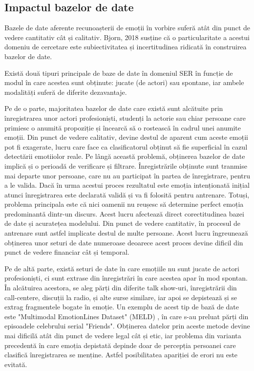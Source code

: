 \documentclass[a4paper,12pt]{book}
\begin{document}
				\subsection{Impactul bazelor de date}
					Bazele de date aferente recunoașterii de emoții în vorbire suferă atât din punct de vedere cantitativ cât și calitativ. Bjorn, 2018 \cite{bjorn1} susține că o particularitate a acestui domeniu de cercetare este subiectivitatea și incertitudinea ridicată în construirea bazelor de date. \par 
					Există două tipuri principale de baze de date în domeniul SER în funcție de modul în care acestea sunt obținute: jucate (de actori) sau spontane, iar ambele modalități suferă de diferite dezavantaje. \par
					Pe de o parte, majoritatea bazelor de date care există sunt alcătuite prin înregistrarea unor actori profesioniști, studenți la actorie sau chiar persoane care primiesc o anumită propoziție și încearcă să o rostească în cadrul unei anumite emoții. Din punct de vedere calitativ, devine destul de aparent cum aceste emoții pot fi exagerate, lucru care face ca clasificatorul obținut să fie superficial în cazul detectării emotiiolor reale. Pe lângă această problemă, obținerea bazelor de date implică și o perioadă de verificare și filtrare. Înregistrările obținute sunt tranmise mai departe unor persoane, care nu au participat în partea de înregistrare, pentru a le valida. Dacă în urma acestui proces rezultatul este emoția intenționată inițial atunci înregistrarea este declarată validă și va fi folosită pentru antrenare. Totuși, problema principala este că nici oamenii nu reușesc să determine perfect emoția predominantă dintr-un discurs. Acest lucru afectează direct corectitudinea bazei de date și acuratețea modelului. Din punct de vedere cantitativ, în procesul de antrenare sunt astfel implicate destul de multe persoane. Acest lucru îngreunează obținerea unor seturi de date numeroase deoarece acest proces devine dificil din punct de vedere financiar cât și temporal.\par
					Pe de altă parte, există seturi de date în care emoțiile nu sunt jucate de actori profesioniști, ci sunt extrase din înregistrări în care acestea apar în mod spontan. În alcătuirea acestora, se aleg părți din diferite talk show-uri, înregistrării din call-centere, discuții la radio, și alte surse similare, iar apoi se depistează și se extrag fragmentele bogate în emoție. Un exemplu de acest tip de bază de date este "Multimodal EmotionLines Dataset" (MELD) \cite{meld}, în care s-au preluat părți din episoadele celebrului serial "Friends". Obținerea datelor prin aceste metode devine mai dificilă atât din punct de vedere legal cât și etic, iar problema din varianta precedentă în care emoția depistată depinde doar de percepția persoanei care clasifică înregistrarea se menține. Astfel posibilitatea apariției de erori nu este evitată. \par
\end{document}
